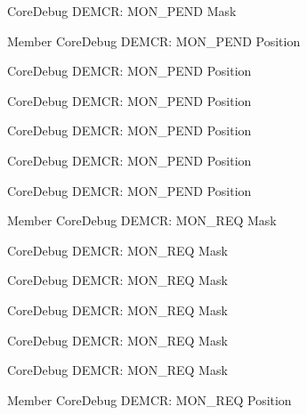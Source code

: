 \begin{DoxyRefList}
\label{deprecated__deprecated000503}%
%
Core\+Debug DEMCR\+: MON\+\_\+\+PEND Mask  
\item[Member \doxylink{group__CMSIS__CoreDebug_ga1e2f706a59e0d8131279af1c7e152f8d}{Core\+Debug\+\_\+\+DEMCR\+\_\+\+MON\+\_\+\+PEND\+\_\+\+Pos} ]\label{deprecated__deprecated000051}%
%
Core\+Debug DEMCR\+: MON\+\_\+\+PEND Position 

\label{deprecated__deprecated000337}%
%
Core\+Debug DEMCR\+: MON\+\_\+\+PEND Position 

\label{deprecated__deprecated000195}%
%
Core\+Debug DEMCR\+: MON\+\_\+\+PEND Position 

\label{deprecated__deprecated000502}%
%
Core\+Debug DEMCR\+: MON\+\_\+\+PEND Position 

\label{deprecated__deprecated000604}%
%
Core\+Debug DEMCR\+: MON\+\_\+\+PEND Position 

\label{deprecated__deprecated000413}%
%
Core\+Debug DEMCR\+: MON\+\_\+\+PEND Position  
\item[Member \doxylink{group__CMSIS__CoreDebug_gae6384cbe8045051186d13ef9cdeace95}{Core\+Debug\+\_\+\+DEMCR\+\_\+\+MON\+\_\+\+REQ\+\_\+\+Msk} ]\label{deprecated__deprecated000410}%
%
Core\+Debug DEMCR\+: MON\+\_\+\+REQ Mask 

\label{deprecated__deprecated000048}%
%
Core\+Debug DEMCR\+: MON\+\_\+\+REQ Mask 

\label{deprecated__deprecated000601}%
%
Core\+Debug DEMCR\+: MON\+\_\+\+REQ Mask 

\label{deprecated__deprecated000499}%
%
Core\+Debug DEMCR\+: MON\+\_\+\+REQ Mask 

\label{deprecated__deprecated000334}%
%
Core\+Debug DEMCR\+: MON\+\_\+\+REQ Mask 

\label{deprecated__deprecated000192}%
%
Core\+Debug DEMCR\+: MON\+\_\+\+REQ Mask  
\item[Member \doxylink{group__CMSIS__CoreDebug_ga341020a3b7450416d72544eaf8e57a64}{Core\+Debug\+\_\+\+DEMCR\+\_\+\+MON\+\_\+\+REQ\+\_\+\+Pos} ]\label{deprecated__deprecated000333}%
%
Core\+Debug DEMCR\+: MON\+\_\+\+REQ Position 


\end{DoxyRefList}
